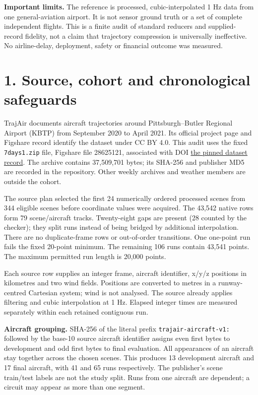 \documentclass[11pt]{article}
\newcommand{\ArchiveBytes}{37,509,701}
\newcommand{\NativeRows}{43,542}
\newcommand{\SourceScenes}{344}
\newcommand{\ChosenScenes}{24}
\newcommand{\WorkingPoints}{43,541}
\newcommand{\WorkingRuns}{106}
\newcommand{\SourceGaps}{28}
\newcommand{\DevAircraft}{13}
\newcommand{\FinalAircraft}{17}
\newcommand{\DevRuns}{41}
\newcommand{\FinalRuns}{65}
\begin{document}
\textbf{Important limits.} The reference is processed, cubic-interpolated 1 Hz data from one general-aviation airport. It is not sensor ground truth or a set of complete independent flights. This is a finite audit of standard reducers and supplied-record fidelity, not a claim that trajectory compression is universally ineffective. No airline-delay, deployment, safety or financial outcome was measured.

\clearpage
\section*{1. Source, cohort and chronological safeguards}
TrajAir documents aircraft trajectories around Pittsburgh--Butler Regional Airport (KBTP) from September 2020 to April 2021. Its official project page and Figshare record identify the dataset under CC BY 4.0. This audit uses the fixed \texttt{7days1.zip} file, Figshare file 28625121, associated with DOI \href{https://doi.org/10.1184/R1/14866251.v1}{the pinned dataset record}. The archive contains \ArchiveBytes{} bytes; its SHA-256 and publisher MD5 are recorded in the repository. Other weekly archives and weather members are outside the cohort.

The source plan selected the first \ChosenScenes{} numerically ordered processed scenes from \SourceScenes{} eligible scenes before coordinate values were acquired. The \NativeRows{} native rows form 79 scene/aircraft tracks. Twenty-eight gaps are present (\SourceGaps{} counted by the checker); they split runs instead of being bridged by additional interpolation. There are no duplicate-frame rows or out-of-order transitions. One one-point run fails the fixed 20-point minimum. The remaining \WorkingRuns{} runs contain \WorkingPoints{} points. The maximum permitted run length is 20,000 points.

Each source row supplies an integer frame, aircraft identifier, x/y/z positions in kilometres and two wind fields. Positions are converted to metres in a runway-centred Cartesian system; wind is not analysed. The source already applies filtering and cubic interpolation at 1 Hz. Elapsed integer times are measured separately within each retained contiguous run.

\textbf{Aircraft grouping.} SHA-256 of the literal prefix \texttt{trajair-aircraft-v1:} followed by the base-10 source aircraft identifier assigns even first bytes to development and odd first bytes to final evaluation. All appearances of an aircraft stay together across the chosen scenes. This produces \DevAircraft{} development aircraft and \FinalAircraft{} final aircraft, with \DevRuns{} and \FinalRuns{} runs respectively. The publisher's scene train/test labels are not the study split. Runs from one aircraft are dependent; a circuit may appear as more than one segment.
\end{document}
